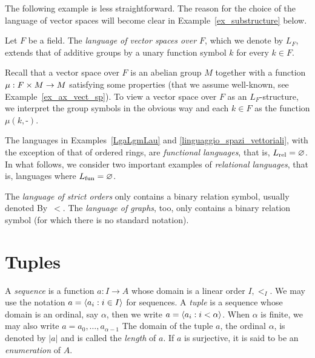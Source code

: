 The following example is less straightforward. The reason for the choice of the language of vector spaces will become clear in Example~\ref{ex_substructure} below.

\begin{example}\label{linguaggio_spazi_vettoriali}
Let $F$ be a field. The \emph{language of vector spaces over $F$\/}, which we denote by $L_F$, extends that of additive groups by a unary function symbol $k$ for every $k\in F$. 

Recall that a vector space over $F$ is an abelian group $M$ together with a function $\mu:F\times M\rightarrow M$ satisfying some properties (that we assume well-known, see Example~\ref{ex_ax_vect_sp}).
 To view a vector space over $F$ as an $L_F$-structure, we interpret the group symbols in the obvious way and each $k\in F$ as the function $\mu(k,\mbox{-})$.\QED
\end{example}

The languages in Examples~\ref{LgaLgmLau} and \ref{linguaggio_spazi_vettoriali}, with the exception of that of ordered rings, are \emph{functional languages}, that is, $L_{\rm rel}=\varnothing$. In what follows, we consider two important examples of \emph{relational languages\/}, that is, languages where $L_{\rm fun}=\varnothing$.

\begin{example}\label{expl_graph1}
The \emph{language of strict orders\/} only contains a binary relation symbol, usually denoted By~$<$. The \emph{language of graphs\/}, too, only contains a binary relation symbol (for which there is no standard notation).\QED
\end{example}


\section{Tuples}

A \emph{sequence\/} is a function  $a:I\to A$ whose domain is a linear order $I,<_I$.
We may use the notation \emph{$a=\langle a_i: i\in I\rangle$} for sequences.
A \emph{tuple\/} is a sequence whose domain is an ordinal, say $\alpha$, then we write  $a=\langle a_i: i<\alpha\rangle$.
When $\alpha$ is finite, we may also write \emph{$a=a_0,\dots,a_{\alpha-1}$}
The domain of the tuple $a$, the ordinal $\alpha$, is denoted by \emph{$|a|$\/} and is called the \emph{length\/} of $a$.
If $a$ is surjective, it is said to be an \emph{enumeration\/} of $A$.

